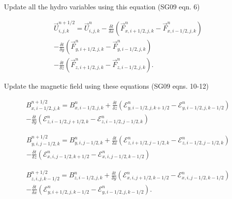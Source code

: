 Update all the hydro variables using this equation (SG09 eqn. 6)

\begin{equation}
    \begin{aligned}
        \vec{U}^{n+1/2}_{i,j,k} = \vec{U}^{n}_{i,j,k}
        - \frac{\delta t}{\delta x} \left( \vec{F}^n_{x,i+1/2,j,k} - \vec{F}^n_{x,i-1/2,j,k} \right) \\
        - \frac{\delta t}{\delta y} \left( \vec{F}^n_{y,i+1/2,j,k} - \vec{F}^n_{y,i-1/2,j,k} \right) \\
        - \frac{\delta t}{\delta z} \left( \vec{F}^n_{z,i+1/2,j,k} - \vec{F}^n_{z,i-1/2,j,k} \right).
    \end{aligned}
\end{equation}

Update the magnetic field using these equations (SG09 eqns. 10-12)

\begin{equation}
    \begin{aligned}
        B^{n+1/2}_{x,i-1/2,j,k} = B^{n}_{x,i-1/2,j,k}
        + \frac{\delta t}{\delta z} \left( \mathcal{E}^n_{y,i-1/2,j,k+1/2} - \mathcal{E}^n_{y,i-1/2,j,k-1/2} \right) \\
        - \frac{\delta t}{\delta y} \left( \mathcal{E}^n_{z,i-1/2,j+1/2,k} - \mathcal{E}^n_{z,i-1/2,j-1/2,k} \right)
    \end{aligned}
\end{equation}

\begin{equation}
    \begin{aligned}
        B^{n+1/2}_{y,i,j-1/2,k} = B^{n}_{y,i,j-1/2,k}
        + \frac{\delta t}{\delta x} \left( \mathcal{E}^n_{z,i+1/2,j-1/2,k} - \mathcal{E}^n_{z,i-1/2,j-1/2,k} \right) \\
        - \frac{\delta t}{\delta z} \left( \mathcal{E}^n_{x,i,j-1/2,k+1/2} - \mathcal{E}^n_{x,i,j-1/2,k-1/2} \right)
    \end{aligned}
\end{equation}

\begin{equation}
    \begin{aligned}
        B^{n+1/2}_{z,i,j,k-1/2} = B^{n}_{z,i-1/2,j,k}
        + \frac{\delta t}{\delta y} \left( \mathcal{E}^n_{x,i,j+1/2,k-1/2} - \mathcal{E}^n_{x,i,j-1/2,k-1/2} \right) \\
        - \frac{\delta t}{\delta x} \left( \mathcal{E}^n_{y,i+1/2,j,k-1/2} - \mathcal{E}^n_{y,i-1/2,j,k-1/2} \right).
    \end{aligned}
\end{equation}

